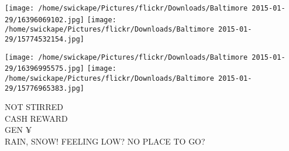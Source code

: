 \documentclass[10pt,letterpaper]{article}
\begin{document}
\texttt{[image: /home/swickape/Pictures/flickr/Downloads/Baltimore 2015-01-29/16396069102.jpg]}
\texttt{[image: /home/swickape/Pictures/flickr/Downloads/Baltimore 2015-01-29/15774532154.jpg]}

\texttt{[image: /home/swickape/Pictures/flickr/Downloads/Baltimore 2015-01-29/16396995575.jpg]}
\texttt{[image: /home/swickape/Pictures/flickr/Downloads/Baltimore 2015-01-29/15776965383.jpg]}

NOT STIRRED\\
CASH REWARD\\
GEN ¥\\
RAIN, SNOW!  FEELING LOW?  NO PLACE TO GO?\\
\pagebreak
\end{document}
